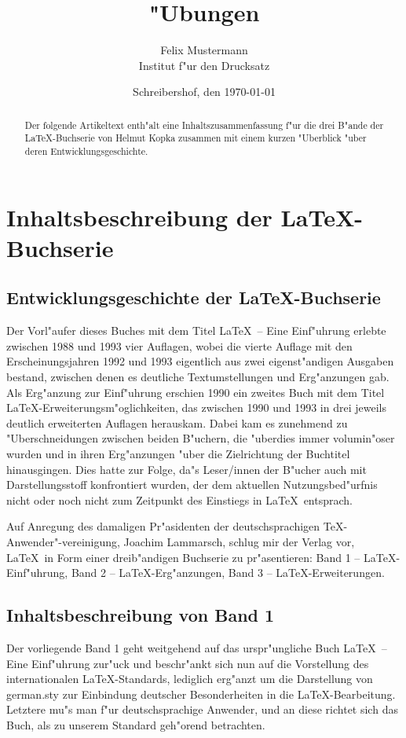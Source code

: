 \documentclass[twoside]{report}
\begin{document}
\title{"Ubungen}\author{Felix Mustermann\\Institut f"ur den Drucksatz}
\date{Schreibershof, den \today} \maketitle
\begin{abstract}
Der folgende Artikeltext enth"alt eine Inhaltszusammenfassung f"ur
die drei B"ande der \LaTeX-Buchserie von Helmut Kopka zusammen mit
einem kurzen "Uberblick "uber deren Entwicklungsgeschichte.
\end{abstract}

\chapter{Inhaltsbeschreibung der \LaTeX-Buchserie}
 
\section{Entwicklungsgeschichte der \LaTeX-Buchserie}
Der Vorl"aufer dieses Buches mit dem Titel \LaTeX\ -- Eine Einf"uhrung
erlebte zwischen 1988 und 1993 vier Auflagen, wobei die vierte Auflage
mit den Erscheinungsjahren 1992 und 1993 eigentlich aus zwei
eigenst"andigen Ausgaben bestand, zwischen denen es deutliche
Textumstellungen und Erg"anzungen gab. Als Erg"anzung zur Einf"uhrung
erschien 1990 ein zweites Buch mit dem Titel
\LaTeX-Erweiterungsm"oglichkeiten, das zwischen 1990 und 1993 in drei jeweils
deutlich erweiterten Auflagen herauskam. Dabei kam es zunehmend zu 
"Uberschneidungen zwischen beiden B"uchern, die "uberdies immer volumin"oser
wurden und in ihren Erg"anzungen "uber die Zielrichtung der
Buchtitel hinausgingen. Dies hatte zur Folge, da"s Leser/innen der B"ucher
auch mit Darstellungsstoff konfrontiert wurden, der dem aktuellen 
Nutzungsbed"urfnis nicht oder noch nicht zum Zeitpunkt des Einstiegs in \LaTeX\ 
entsprach.

Auf Anregung des damaligen Pr"asidenten der deutschsprachigen
\TeX-Anwender"-vereinigung, Joachim Lammarsch, schlug mir der Verlag vor,
\LaTeX\ in Form einer dreib"andigen Buchserie zu pr"asentieren: 
Band 1 -- \LaTeX-Einf"uhrung, Band 2 -- \LaTeX-Erg"anzungen, Band 3 --
\LaTeX-Erweiterungen.

\section{Inhaltsbeschreibung von Band 1}
Der vorliegende Band 1 geht weitgehend auf das urspr"ungliche Buch 
\LaTeX\ -- Eine Einf"uhrung zur"uck und beschr"ankt sich nun auf die
Vorstellung des internationalen \LaTeX-Standards, lediglich erg"anzt
um die Darstellung von german.sty zur Einbindung deutscher 
Besonderheiten in die \LaTeX-Bearbeitung. Letztere mu"s man f"ur 
deutschsprachige Anwender, und an diese richtet sich das Buch, als zu
unserem Standard geh"orend betrachten. 
\end{document}
